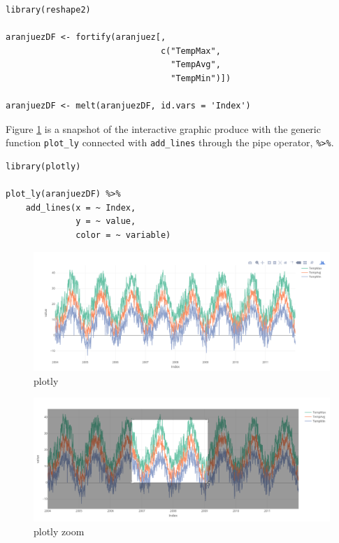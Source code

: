 
\lstset{language=r,label= ,caption= ,captionpos=b,numbers=none}
\begin{lstlisting}
library(reshape2)

aranjuezDF <- fortify(aranjuez[,
                               c("TempMax",
                                 "TempAvg",
                                 "TempMin")])

aranjuezDF <- melt(aranjuezDF, id.vars = 'Index')
\end{lstlisting}

Figure \ref{fig:plotly} is a snapshot of the interactive graphic produce
with the generic function \texttt{plot\_ly} connected with \texttt{add\_lines} through
the pipe operator, \texttt{\%>\%}.
\lstset{language=r,label= ,caption= ,captionpos=b,numbers=none}
\begin{lstlisting}
library(plotly)

plot_ly(aranjuezDF) %>%
    add_lines(x = ~ Index,
              y = ~ value,
              color = ~ variable)

\end{lstlisting}

\begin{figure}[htbp]
\centering
\includegraphics[width=.9\linewidth]{figs/plotly_aranjuez.png}
\caption{plotly \label{fig:plotly}}
\end{figure}

\begin{figure}[htbp]
\centering
\includegraphics[width=.9\linewidth]{figs/plotly_aranjuez_zoom.png}
\caption{plotly zoom \label{fig:plotly_zoom}}
\end{figure}


